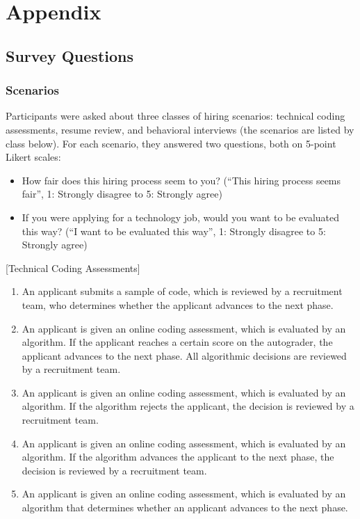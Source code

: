 \section{Appendix}
\label{appendix}

\subsection{Survey Questions}
\label{app:survey}

\subsubsection{Scenarios}

Participants were asked about three classes of hiring scenarios: technical coding assessments, resume review, and behavioral interviews (the scenarios are listed by class below). For each scenario, they answered two questions, both on 5-point Likert scales:
\begin{itemize}
    \item How fair does this hiring process seem to you? (``This hiring process seems fair'', 1: Strongly disagree to 5: Strongly agree)
    \item If you were applying for a technology job, would you want to be evaluated this way? (``I want to be evaluated this way'', 1: Strongly disagree to 5: Strongly agree)
\end{itemize}

[Technical Coding Assessments]
\begin{enumerate}
\item An applicant submits a sample of code, which is reviewed by a recruitment team, who determines whether the applicant advances to the next phase.
\item An applicant is given an online coding assessment, which is evaluated by an algorithm. If the applicant reaches a certain score on the autograder, the applicant advances to the next phase. All algorithmic decisions are reviewed by a recruitment team.
\item An applicant is given an online coding assessment, which is evaluated by an algorithm. If the algorithm rejects the applicant, the decision is reviewed by a recruitment team. 
\item An applicant is given an online coding assessment, which is evaluated by an algorithm. If the algorithm advances the applicant to the next phase, the decision is reviewed by a recruitment team. 
\item An applicant is given an online coding assessment, which is evaluated by an algorithm that determines whether an applicant advances to the next phase. 
\end{enumerate}

